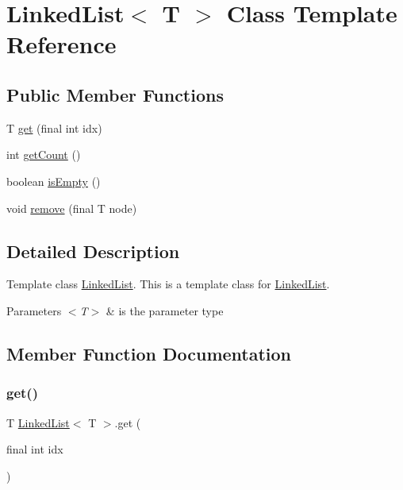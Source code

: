 \hypertarget{class_linked_list}{}\section{Linked\+List$<$ T $>$ Class Template Reference}
\label{class_linked_list}
\subsection*{Public Member Functions}
\begin{DoxyCompactItemize}
\item 
T \mbox{\hyperlink{class_linked_list_a00c77b8619b458b47bfbbc53f3d14ce7}{get}} (final int idx)
\item 
int \mbox{\hyperlink{class_linked_list_acd5221f9ec3d5eafa37321d5ef0b9396}{get\+Count}} ()
\item 
boolean \mbox{\hyperlink{class_linked_list_aecae3d82587c52087a4f65d6c56900e2}{is\+Empty}} ()
\item 
void \mbox{\hyperlink{class_linked_list_ad4873babcc03951eafb5cc17daebbfaf}{remove}} (final T node)
\end{DoxyCompactItemize}


\subsection{Detailed Description}
Template class \mbox{\hyperlink{class_linked_list}{Linked\+List}}. This is a template class for \mbox{\hyperlink{class_linked_list}{Linked\+List}}.


\begin{DoxyParams}{Parameters}
{\em $<$\+T$>$} & is the parameter type \\
\hline
\end{DoxyParams}


\subsection{Member Function Documentation}
\mbox{\label{class_linked_list_a00c77b8619b458b47bfbbc53f3d14ce7}} 
\subsubsection{\texorpdfstring{get()}{get()}}
{\footnotesize\ttfamily T \mbox{\hyperlink{class_linked_list}{Linked\+List}}$<$ T $>$.get (\begin{DoxyParamCaption}\item[{final int}]{idx }\end{DoxyParamCaption})\hspace{0.3cm}{\ttfamily [inline]}}

